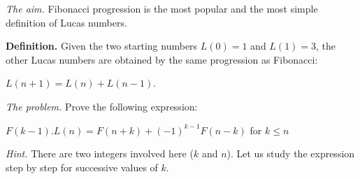{\noindent \textit{The aim.}
Fibonacci progression is the most popular and the most simple definition of Lucas numbers.
\medskip

\textbf{Definition.}
Given the two starting numbers $L(0) = 1$ and $L(1) = 3$, 
the other Lucas numbers are obtained by the same progression as Fibonacci: 

$L(n+1) = L(n)+L(n-1)$.
\medskip

%
%

\noindent \textit{The problem.}
Prove the following expression:

$F(k-1).L(n) = F(n+k)+ (-1)^{k-1}F(n-k)$ for $k \leq n$
\bigskip

\noindent \textit{Hint.} 
There are two integers involved here ($k$ and $n$).
Let us study the expression step by step for successive values of $k$.
\medskip

%
%
%
%
%
%
%
%
%
%
%
%

}
